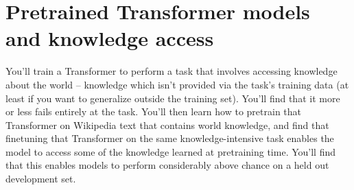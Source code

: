 \graphicspath{ {images/} }






\newcommand{\mingpt}{\texttt{minGPT}\xspace}
\newcommand{\ourmodel}{\texttt{minLinT5}\xspace}

\lstset{basicstyle=\ttfamily,columns=flexible,numbers=none}

\section{Pretrained Transformer models and knowledge access}
\label{sec:char_enc}


You'll train a Transformer to perform a task that involves accessing knowledge about the world -- knowledge which isn't provided via the task's training data (at least if you want to generalize outside the training set). You'll find that it more or less fails entirely at the task.
You'll then learn how to pretrain that Transformer on Wikipedia text that contains world knowledge, and find that finetuning that Transformer on the same knowledge-intensive task enables the model to access some of the knowledge learned at pretraining time.
You'll find that this enables models to perform considerably above chance on a held out development set.

